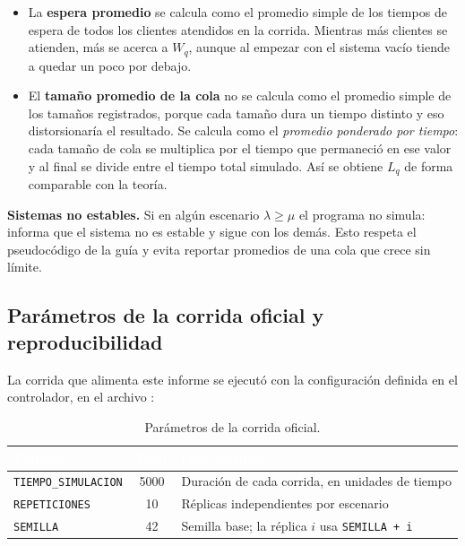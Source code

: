 \documentclass[11pt,a4paper]{article}
\renewcommand{\arraystretch}{1.08}
\begin{document}
\begin{itemize}
    \item La \textbf{espera promedio} se calcula como el promedio simple de los tiempos
    de espera de todos los clientes atendidos en la corrida. Mientras más clientes se
    atienden, más se acerca a $W_q$, aunque al empezar con el sistema vacío tiende a
    quedar un poco por debajo.
    \item El \textbf{tamaño promedio de la cola} no se calcula como el promedio simple
    de los tamaños registrados, porque cada tamaño dura un tiempo distinto y eso
    distorsionaría el resultado. Se calcula como el \emph{promedio ponderado por
    tiempo}: cada tamaño de cola se multiplica por el tiempo que permaneció en ese valor
    y al final se divide entre el tiempo total simulado. Así se obtiene $L_q$ de forma
    comparable con la teoría.
\end{itemize}

\noindent\textbf{Sistemas no estables.} Si en algún escenario $\lambda \geq \mu$ el
programa no simula: informa que el sistema no es estable y sigue con los demás. Esto
respeta el pseudocódigo de la guía y evita reportar promedios de una cola que crece sin
límite.

\subsection{Parámetros de la corrida oficial y reproducibilidad}

La corrida que alimenta este informe se ejecutó con la configuración definida en el
controlador, en el archivo :

\begin{table}[h!]
\centering
\setlength{\arrayrulewidth}{0.75pt}
\renewcommand{\arraystretch}{1.25}
\begin{tabular}{|l|c|l|}
\hline
\rowcolor{headerblue}
\textbf{\textcolor{white}{Variable}} & \textbf{\textcolor{white}{Valor}} & \textbf{\textcolor{white}{Qué controla}} \\ \hline
\texttt{TIEMPO\_SIMULACION} & 5000 & Duración de cada corrida, en unidades de tiempo \\ \hline
\rowcolor{rowlight}
\texttt{REPETICIONES} & 10 & Réplicas independientes por escenario \\ \hline
\texttt{SEMILLA} & 42 & Semilla base; la réplica $i$ usa \texttt{SEMILLA + i} \\ \hline
\end{tabular}
\caption{Parámetros de la corrida oficial.}
\end{table}
\end{document}
